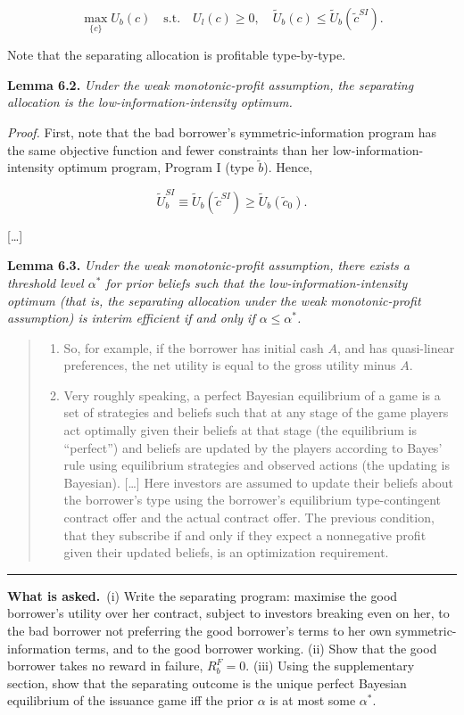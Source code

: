\documentclass[11pt,a4paper]{article}
\newcommand{\asked}{\par\medskip\noindent\textbf{What is asked.}~}
\newcommand{\stmtend}{\par\endgroup\nopagebreak\noindent\rule{\linewidth}{0.4pt}\par\medskip}
\begin{document}
\[\max_{\{c\}} U_b(c) \quad \text{s.t.} \quad U_l(c) \geqslant 0, \quad \tilde{U}_b(c) \leqslant \tilde{U}_b(\tilde{c}^{SI}).\]

Note that the separating allocation is profitable type-by-type.

\textbf{Lemma 6.2.} \emph{Under the weak monotonic-profit assumption, the separating allocation is
the low-information-intensity optimum.}

\emph{Proof.} First, note that the bad borrower's symmetric-information program has the same
objective function and fewer constraints than her low-information-intensity optimum program, Program
I (type \(\tilde{b}\)). Hence,

\[\tilde{U}_b^{SI} \equiv \tilde{U}_b(\tilde{c}^{SI}) \geqslant \tilde{U}_b(\tilde{c}_0).\]

{[}\ldots{]}

\textbf{Lemma 6.3.} \emph{Under the weak monotonic-profit assumption, there exists a threshold level
\(\alpha^*\) for prior beliefs such that the low-information-intensity optimum (that is, the
separating allocation under the weak monotonic-profit assumption) is interim efficient if and only
if \(\alpha \leqslant \alpha^*\).}

\begin{quote}
\begin{enumerate}
\def\labelenumi{\arabic{enumi}.}
\setcounter{enumi}{67}
\item
  So, for example, if the borrower has initial cash \(A\), and has quasi-linear preferences, the net
  utility is equal to the gross utility minus \(A\).
\item
  Very roughly speaking, a perfect Bayesian equilibrium of a game is a set of strategies and beliefs
  such that at any stage of the game players act optimally given their beliefs at that stage (the
  equilibrium is ``perfect'') and beliefs are updated by the players according to Bayes' rule using
  equilibrium strategies and observed actions (the updating is Bayesian). {[}\ldots{]} Here
  investors are assumed to update their beliefs about the borrower's type using the borrower's
  equilibrium type-contingent contract offer and the actual contract offer. The previous condition,
  that they subscribe if and only if they expect a nonnegative profit given their updated beliefs,
  is an optimization requirement.
\end{enumerate}
\end{quote}
\stmtend

\asked (i) Write the separating program: maximise the good borrower's utility over her contract, subject to investors breaking even on her, to the bad borrower not preferring the good borrower's terms to her own symmetric-information terms, and to the good borrower working. (ii) Show that the good borrower takes no reward in failure, $R_b^F=0$. (iii) Using the supplementary section, show that the separating outcome is the unique perfect Bayesian equilibrium of the issuance game iff the prior $\alpha$ is at most some $\alpha^*$.
\end{document}
